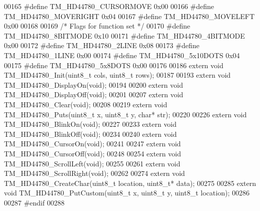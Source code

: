 \begin{DoxyCode}
00165 \textcolor{preprocessor}{#define TM\_HD44780\_CURSORMOVE           0x00}
00166 \textcolor{preprocessor}{#define TM\_HD44780\_MOVERIGHT            0x04}
00167 \textcolor{preprocessor}{#define TM\_HD44780\_MOVELEFT             0x00}
00168 
00169 \textcolor{comment}{/* Flags for function set */}
00170 \textcolor{preprocessor}{#define TM\_HD44780\_8BITMODE             0x10}
00171 \textcolor{preprocessor}{#define TM\_HD44780\_4BITMODE             0x00}
00172 \textcolor{preprocessor}{#define TM\_HD44780\_2LINE                0x08}
00173 \textcolor{preprocessor}{#define TM\_HD44780\_1LINE                0x00}
00174 \textcolor{preprocessor}{#define TM\_HD44780\_5x10DOTS             0x04}
00175 \textcolor{preprocessor}{#define TM\_HD44780\_5x8DOTS              0x00}
00176 
00186 \textcolor{keyword}{extern} \textcolor{keywordtype}{void} TM\_HD44780\_Init(uint8\_t cols, uint8\_t rows);
00187 
00193 \textcolor{keyword}{extern} \textcolor{keywordtype}{void} TM\_HD44780\_DisplayOn(\textcolor{keywordtype}{void});
00194 
00200 \textcolor{keyword}{extern} \textcolor{keywordtype}{void} TM\_HD44780\_DisplayOff(\textcolor{keywordtype}{void});
00201 
00207 \textcolor{keyword}{extern} \textcolor{keywordtype}{void} TM\_HD44780\_Clear(\textcolor{keywordtype}{void});
00208 
00219 \textcolor{keyword}{extern} \textcolor{keywordtype}{void} TM\_HD44780\_Puts(uint8\_t x, uint8\_t y, \textcolor{keywordtype}{char}* str);
00220 
00226 \textcolor{keyword}{extern} \textcolor{keywordtype}{void} TM\_HD44780\_BlinkOn(\textcolor{keywordtype}{void});
00227 
00233 \textcolor{keyword}{extern} \textcolor{keywordtype}{void} TM\_HD44780\_BlinkOff(\textcolor{keywordtype}{void});
00234 
00240 \textcolor{keyword}{extern} \textcolor{keywordtype}{void} TM\_HD44780\_CursorOn(\textcolor{keywordtype}{void});
00241 
00247 \textcolor{keyword}{extern} \textcolor{keywordtype}{void} TM\_HD44780\_CursorOff(\textcolor{keywordtype}{void});
00248 
00254 \textcolor{keyword}{extern} \textcolor{keywordtype}{void} TM\_HD44780\_ScrollLeft(\textcolor{keywordtype}{void});
00255 
00261 \textcolor{keyword}{extern} \textcolor{keywordtype}{void} TM\_HD44780\_ScrollRight(\textcolor{keywordtype}{void});
00262 
00274 \textcolor{keyword}{extern} \textcolor{keywordtype}{void} TM\_HD44780\_CreateChar(uint8\_t location, uint8\_t* data);
00275 
00285 \textcolor{keyword}{extern} \textcolor{keywordtype}{void} TM\_HD44780\_PutCustom(uint8\_t x, uint8\_t y, uint8\_t location);
00286 
00287 \textcolor{preprocessor}{#endif}
00288 
\end{DoxyCode}
